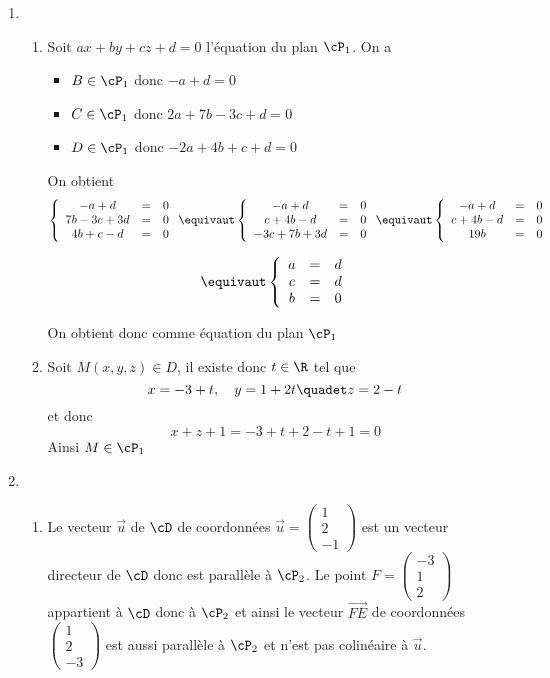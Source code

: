 \documentclass[a4paper, 11pt,reqno]{article}
\begin{document}
\begin{correction}
\begin{enumerate}
\item \begin{enumerate}
\item Soit $ax+by+cz+d=0$ l'équation du plan $\cP_1$. On a 
\begin{itemize}
\item $B\in \cP_1$ donc $-a+d=0$
\item $C\in \cP_1$ donc $2a+7b-3c+d=0$
\item $D\in \cP_1$ donc $-2a+4b+c+d=0$
\end{itemize}
On obtient 
$$
\left\{ \begin{array}{ccc}
-a+d&=&0\\
7b-3c+3d&=&0\\
4b+c-d&=&0
\end{array}\right.
\equivaut 
\left\{ \begin{array}{ccc}
-a+d&=&0\\
c+4b-d&=&0\\
-3c+7b+3d&=&0
\end{array}\right.
\equivaut 
\left\{ \begin{array}{ccc}
-a+d&=&0\\
c+4b-d&=&0\\
19b&=&0
\end{array}\right.
$$

$$\equivaut 
\left\{ \begin{array}{ccc}
a&=&d\\
c&=&d\\
b&=&0
\end{array}\right.
$$

On obtient donc comme équation du plan $\cP_1$

\item Soit $M(x,y,z)\in D$, il existe donc $t\in \R$ tel que 
$$x=-3+t, \quad y=1+2t \quadet z=2-t$$
et donc 
$$x+z+1 = -3+t +2-t+1= 0$$
Ainsi $M\in \cP_1$

\end{enumerate}

\item 
\begin{enumerate}
\item  Le vecteur  $\vec{u}$ de $\cD$ de coordonnées $\vec{u} =\begin{pmatrix}
1\\
2\\
-1
\end{pmatrix}$  est un vecteur directeur de $\cD$ donc est parallèle à $\cP_2$. Le point $F=\begin{pmatrix}
-3\\
1\\
2
\end{pmatrix}$ appartient à $\cD$ donc à $\cP_2$ et ainsi le vecteur $\vec{FE}$ de coordonnées $\begin{pmatrix}
1\\
2\\
-3
\end{pmatrix}$ est aussi parallèle à $\cP_2$ et n'est pas colinéaire à $\vec{u}$. 



\end{enumerate}
\end{enumerate}
\end{correction}
\end{document}
